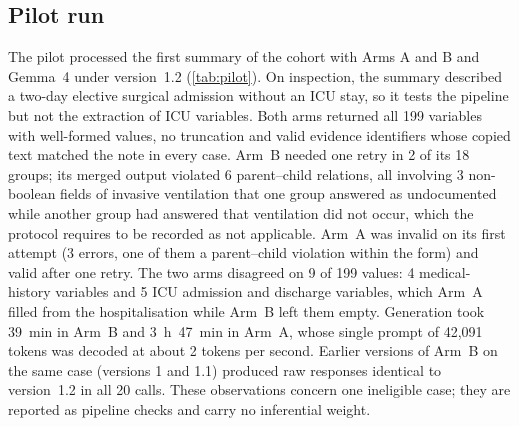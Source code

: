\subsection{Pilot run}\label{sec:res-pilot}

The pilot processed the first summary of the cohort with Arms A and B and Gemma~4 under version~1.2
(\cref{tab:pilot}). On inspection, the summary described a two-day elective surgical admission without an ICU
stay, so it tests the pipeline but not the extraction of ICU variables. Both arms returned all 199 variables
with well-formed values, no truncation and valid evidence identifiers whose copied text matched the note in
every case. Arm~B needed one retry in 2 of its 18 groups; its merged output violated 6 parent--child relations,
all involving 3 non-boolean fields of invasive ventilation that one group answered as undocumented while
another group had answered that ventilation did not occur, which the protocol requires to be recorded as not
applicable. Arm~A was invalid on its first attempt (3 errors, one of them a parent--child violation within the
form) and valid after one retry. The two arms disagreed on 9 of 199 values: 4 medical-history variables and 5
ICU admission and discharge variables, which Arm~A filled from the hospitalisation while Arm~B left them empty.
Generation took 39~min in Arm~B and 3~h~47~min in Arm~A, whose single prompt of 42{,}091 tokens was decoded at
about 2 tokens per second. Earlier versions of Arm~B on the same case (versions 1 and 1.1) produced raw
responses identical to version~1.2 in all 20 calls. These observations concern one ineligible case; they are
reported as pipeline checks and carry no inferential weight.

